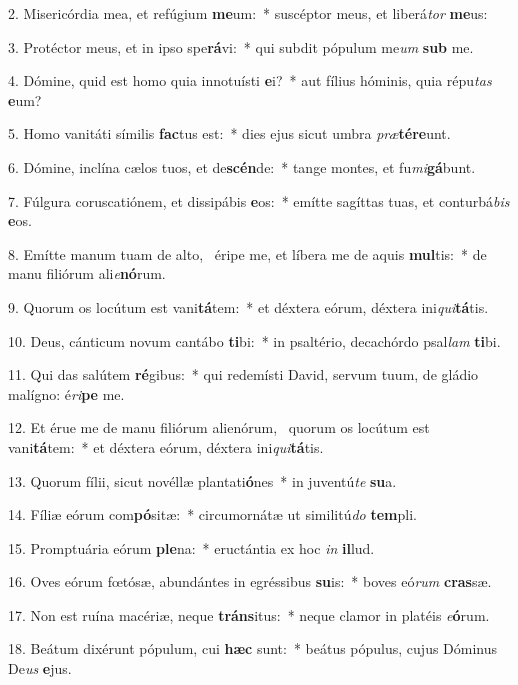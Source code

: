 2. Misericórdia mea, et refúgium \textbf{me}um:~*  suscéptor meus, et liberá\textit{tor} \textbf{me}us:\

3. Protéctor meus, et in ipso spe\textbf{rá}vi:~*  qui subdit pópulum me\textit{um} \textbf{sub} me.\

4. Dómine, quid est homo quia innotuísti \textbf{e}i?~*  aut fílius hóminis, quia répu\textit{tas} \textbf{e}um?\

5. Homo vanitáti símilis \textbf{fac}tus est:~*  dies ejus sicut umbra \textit{præ}\textbf{tér}\textbf{e}unt.\

6. Dómine, inclína cælos tuos, et de\textbf{scén}de:~*  tange montes, et fu\textit{mi}\textbf{gá}bunt.\

7. Fúlgura coruscatiónem, et dissipábis \textbf{e}os:~*  emítte sagíttas tuas, et conturbá\textit{bis} \textbf{e}os.\

8. Emítte manum tuam de alto, \dag\  éripe me, et líbera me de aquis \textbf{mul}tis:~*  de manu filiórum ali\textit{e}\textbf{nó}rum.\

9. Quorum os locútum est vani\textbf{tá}tem:~*  et déxtera eórum, déxtera ini\textit{qui}\textbf{tá}tis.\

10. Deus, cánticum novum cantábo \textbf{ti}bi:~*  in psaltério, decachórdo psal\textit{lam} \textbf{ti}bi.\

11. Qui das salútem \textbf{ré}gibus:~*  qui redemísti David, servum tuum, de gládio malígno: é\textit{ri}\textbf{pe} me.\

12. Et érue me de manu filiórum alienórum, \dag\  quorum os locútum est vani\textbf{tá}tem:~*  et déxtera eórum, déxtera ini\textit{qui}\textbf{tá}tis.\

13. Quorum fílii, sicut novéllæ plantati\textbf{ó}nes~*  in juventú\textit{te} \textbf{su}a.\

14. Fíliæ eórum com\textbf{pó}sitæ:~*  circumornátæ ut similitú\textit{do} \textbf{tem}pli.\

15. Promptuária eórum \textbf{ple}na:~*  eructántia ex hoc \textit{in} \textbf{il}lud.\

16. Oves eórum fœtósæ, abundántes in egréssibus \textbf{su}is:~*  boves eó\textit{rum} \textbf{cras}sæ.\

17. Non est ruína macériæ, neque \textbf{tráns}itus:~*  neque clamor in platéis \textit{e}\textbf{ó}rum.\

18. Beátum dixérunt pópulum, cui \textbf{hæc} sunt:~*  beátus pópulus, cujus Dóminus De\textit{us} \textbf{e}jus.\

